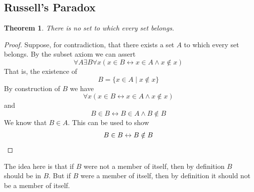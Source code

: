 \documentclass{report}
\newtheorem{theorem}[theo]{Theorem}
\begin{document}
\subsection{Russell's Paradox}
\begin{theorem}
There is no set to which every set belongs.
\end{theorem}
\begin{proof}
Suppose, for contradiction, that there exists a set $A$ to which every set belongs. 
By the subset axiom we can assert 
\begin{equation*}
\forall A\exists B\forall x(x\in B\leftrightarrow x\in A\land x\notin x)
\end{equation*}
That is, the existence of 
\begin{equation*}
B=\{x\in A\mid x\notin x\}
\end{equation*}
By construction of $B$ we have
\begin{equation*}
\forall x(x\in B\leftrightarrow x\in A\land x\notin x)
\end{equation*}
and
\begin{equation*}
B\in B\leftrightarrow B\in A\land B\notin B
\end{equation*}
We know that $B\in A$. This can be used to show
\begin{equation*}
B\in B\leftrightarrow B\notin B\qedhere
\end{equation*}
\end{proof}
\noindent 
The idea here is that if $B$ were not a member of itself, then by definition $B$ should be in $B$. But if $B$ were a member of itself, then by definition it should not be a member of itself.
\newpage
\end{document}
